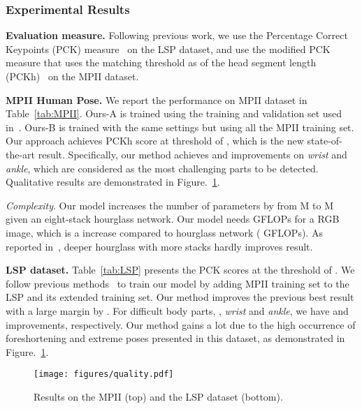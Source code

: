 \documentclass[10pt,twocolumn,letterpaper]{article}
\newcommand{\smalltitle}[1]{\vspace{0.2em}\noindent \textbf{{#1}}}
\begin{document}
\subsubsection{Experimental Results}

\smalltitle{Evaluation measure.} Following previous work, we use the Percentage Correct Keypoints (PCK) measure~\cite{yang2013articulated} on the LSP dataset, and use the modified PCK measure that uses the matching threshold as  of the head segment length (PCKh)~\cite{andriluka20142d} on the MPII dataset.

\smalltitle{MPII Human Pose.} 
We report the performance on MPII dataset in Table~\ref{tab:MPII}. 
Ours-A is trained using the training and validation set used in~\cite{tompson2015efficient}. 
Ours-B is trained with the same settings but using all the MPII training set. 
Our approach achieves  PCKh score at threshold of , which is the new state-of-the-art result. 
Specifically, our method achieves  and  improvements on \textit{wrist} and \textit{ankle}, which are considered as the most challenging parts to be detected. 
Qualitative results are demonstrated in Figure.~\ref{fig:qualitative_results}.

\textit{Complexity}. 
Our model increases the number of parameters by  from  M  to M  given an eight-stack hourglass network. 
Our model needs  GFLOPs for a  RGB image, which is a  increase compared to hourglass network ( GFLOPs). 
As reported in~\cite{newell2016stacked}, deeper hourglass with more stacks hardly improves result.

\smalltitle{LSP dataset.}
Table~\ref{tab:LSP} presents the PCK scores at the threshold of . We follow previous methods~\cite{pishchulin2016deepcut,wei2016convolutional,insafutdinov2016deepercut} to train our model by adding MPII training set to the LSP and its extended training set. 
Our method improves the previous best result with a large margin by . 
For difficult body parts, \eg, \textit{wrist} and \textit{ankle}, we have  and  improvements, respectively. 
Our method gains a lot due to the high occurrence of foreshortening and extreme poses presented in this dataset, as demonstrated in Figure.~\ref{fig:qualitative_results}. 

\begin{figure}[t]
\begin{center}
\texttt{[image: figures/quality.pdf]}
\end{center}
	\vspace{-1em}
   \caption{ Results on the MPII (top) and the LSP dataset (bottom).}
	\label{fig:qualitative_results}
	\vspace{-1em}
\end{figure}
\end{document}
